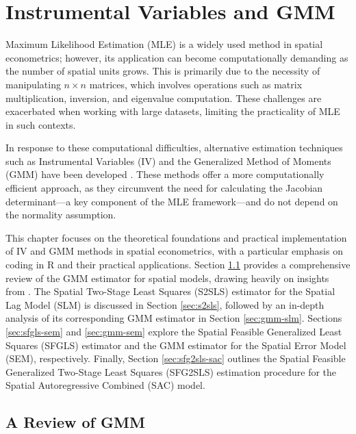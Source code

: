 \chapter{Instrumental Variables and GMM}\label{chapter:gmm}

Maximum Likelihood Estimation (MLE) is a widely used method in spatial econometrics; however, its application can become computationally demanding as the number of spatial units grows. This is primarily due to the necessity of manipulating $n \times n$ matrices, which involves operations such as matrix multiplication, inversion, and eigenvalue computation. These challenges are exacerbated when working with large datasets, limiting the practicality of MLE in such contexts.

In response to these computational difficulties, alternative estimation techniques such as Instrumental Variables (IV) and the Generalized Method of Moments (GMM) have been developed \citep{kelejian1998generalized, kelejian1999generalized, lee2007gmm}.  These methods offer a more computationally efficient approach, as they circumvent the need for calculating the Jacobian determinant---a key component of the MLE framework---and do not depend on the normality assumption.

This chapter focuses on the theoretical foundations and practical implementation of IV and GMM methods in spatial econometrics, with a particular emphasis on coding in R and their practical applications. Section \ref{sec:gmm-review} provides a comprehensive review of the GMM estimator for spatial models, drawing heavily on insights from \cite{pruchaHB}. The Spatial Two-Stage Least Squares (S2SLS) estimator for the Spatial Lag Model (SLM) is discussed in Section \ref{sec:s2sls}, followed by an in-depth analysis of its corresponding GMM estimator in Section \ref{sec:gmm-slm}. Sections \ref{sec:sfgls-sem} and \ref{sec:gmm-sem} explore the Spatial Feasible Generalized Least Squares (SFGLS) estimator and the GMM estimator for the Spatial Error Model (SEM), respectively. Finally, Section \ref{sec:sfg2sls-sac} outlines the Spatial Feasible Generalized Two-Stage Least Squares (SFG2SLS) estimation procedure for the Spatial Autoregressive Combined (SAC) model.


\section{A Review of GMM}\label{sec:gmm-review}

